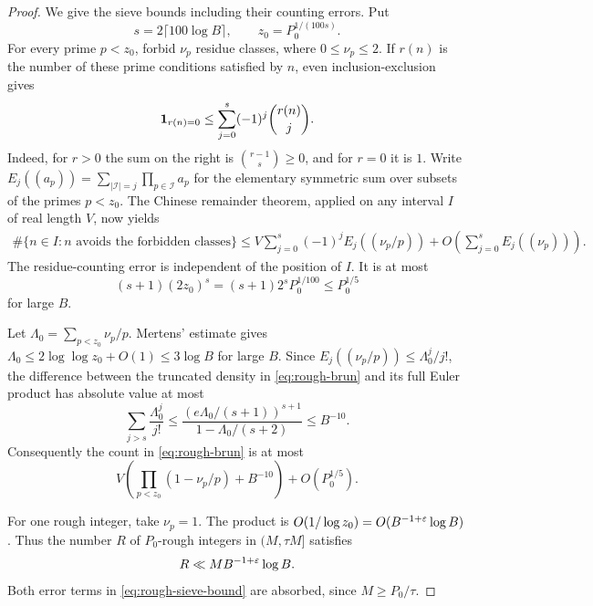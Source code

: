 \begin{proof}
We give the sieve bounds including their counting errors. Put
\[
 s=2\lceil100\log B\rceil,\qquad z_0=P_0^{1/(100s)}.
\]
For every prime $p<z_0$, forbid $\nu_p$ residue classes, where
$0\le\nu_p\le2$. If $r(n)$ is the number of these prime conditions
satisfied by $n$, even inclusion-exclusion gives
\[
 \mathbf 1_{r(n)=0}\le\sum_{j=0}^s(-1)^j\binom{r(n)}j.
\]
Indeed, for $r>0$ the sum on the right is $\binom{r-1}s\ge0$, and for
$r=0$ it is $1$.
Write $E_j((a_p))=\sum_{|\mathcal I|=j}\prod_{p\in\mathcal I}a_p$
for the elementary symmetric sum over subsets of the primes $p<z_0$.
The Chinese remainder theorem, applied on any interval $I$ of real
length $V$, now yields
\begin{equation}\label{eq:rough-brun}
 \begin{split}
 \#\{n\in I:n\text{ avoids the forbidden classes}\}
 \le V\sum_{j=0}^s(-1)^jE_j((\nu_p/p))
       +O\left(\sum_{j=0}^sE_j((\nu_p))\right).
 \end{split}
\end{equation}
The residue-counting error is independent of the position of $I$.
It is at most
\[
 (s+1)(2z_0)^s=(s+1)2^sP_0^{1/100}\le P_0^{1/5}
\]
for large $B$.

Let $\Lambda_0=\sum_{p<z_0}\nu_p/p$. Mertens' estimate gives
$\Lambda_0\le2\log\log z_0+O(1)\le3\log B$ for large $B$.
Since $E_j((\nu_p/p))\le\Lambda_0^j/j!$, the difference between the
truncated density in \eqref{eq:rough-brun} and its full Euler product
has absolute value at most
\[
 \sum_{j>s}\frac{\Lambda_0^j}{j!}
 \le\frac{(e\Lambda_0/(s+1))^{s+1}}{1-\Lambda_0/(s+2)}
 \le B^{-10}.
\]
Consequently the count in \eqref{eq:rough-brun} is at most
\begin{equation}\label{eq:rough-sieve-bound}
 V\left(\prod_{p<z_0}(1-\nu_p/p)+B^{-10}\right)+O(P_0^{1/5}).
\end{equation}

For one rough integer, take $\nu_p=1$. The product is
$O(1/\log z_0)=O(B^{-1+\varepsilon}\log B)$. Thus the number $R$ of
$P_0$-rough integers in $(M,\tau M]$ satisfies
\begin{equation}\label{eq:rough-one-point}
 R\ll M B^{-1+\varepsilon}\log B.
\end{equation}
Both error terms in \eqref{eq:rough-sieve-bound} are absorbed, since
$M\ge P_0/\tau$.


\end{proof}
